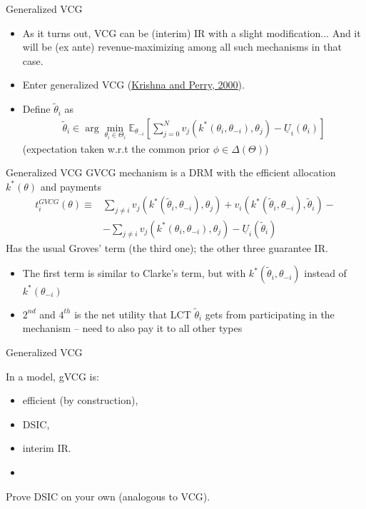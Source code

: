 \documentclass[english,10pt
,aspectratio=169
,handout
]{beamer}
\begin{document}
\begin{frame}{Generalized VCG}
	\begin{itemize}
		\item As it turns out, VCG can be (interim) IR with a slight modification... And it will be (ex ante) revenue-maximizing among all such mechanisms in that case.
		\item Enter \alert{generalized VCG} (\href{https://sites.google.com/site/vjkrishna/research}{\uline{Krishna and Perry, 2000}}).
		\pause\medskip
		\item Define  $\tilde{\theta}_i$ as
		\begin{align*}
		\tilde{\theta}_i \in \arg \min_{\theta_i \in \Theta_i} \mathbb{E}_{\theta_{-i}} \left[ \sum_{j=0}^{N} v_j (k^*(\theta_i,\theta_{-i}),\theta_j) - \underline{U}_i (\theta_i) \right]
		\end{align*}
		(expectation taken w.r.t the common prior $\phi \in \varDelta(\Theta)$)
	\end{itemize}
\end{frame}


\begin{frame}{Generalized VCG}
	GVCG mechanism is a DRM with the efficient allocation $k^*(\theta)$ and payments
	\begin{align*}
	t_i^{GVCG} (\theta) \equiv& \sum_{j \neq i} v_j (k^*(\tilde{\theta}_i,\theta_{-i}),\theta_j) + v_i (k^*(\tilde{\theta}_i,\theta_{-i}),\tilde{\theta}_i) -
	\\& - \sum_{j \neq i} v_j (k^*(\theta_i,\theta_{-i}),\theta_j) - \underline{U}_i (\tilde{\theta}_i)
	\end{align*}
	\pause
	Has the usual Groves' term (the third one); the other three guarantee IR.
	\begin{itemize}
		\item The first term is similar to Clarke's term, but with $k^*(\tilde{\theta}_i,\theta_{-i})$ instead of $k^*(\theta_{-i})$
		\item $2^{nd}$ and $4^{th}$ is the net utility that LCT $\tilde{\theta}_i$ gets from participating in the mechanism -- need to also pay it to all other types
	\end{itemize}
\end{frame}


\begin{frame}{Generalized VCG}
	\begin{theorem}
		In a  model, gVCG is:
		\begin{itemize}
			\item efficient (by construction),
			\item DSIC,
			\item interim IR.
			\item %
		\end{itemize}
	\end{theorem}
	Prove DSIC on your own (analogous to VCG).
\end{frame}
\end{document}
